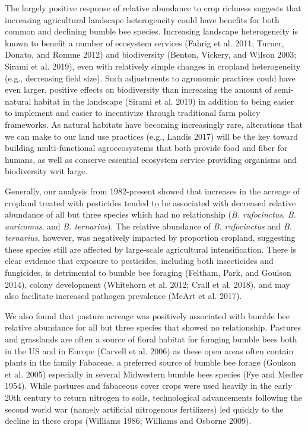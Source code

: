 \documentclass[11pt,]{article}
\begin{document}
The largely positive response of relative abundance to crop richness
suggests that increasing agricultural landscape heterogeneity could have
benefits for both common and declining bumble bee species. Increasing
landscape heterogeneity is known to benefit a number of ecosystem
services (Fahrig et al. 2011; Turner, Donato, and Romme 2012) and
biodiversity (Benton, Vickery, and Wilson 2003; Sirami et al. 2019),
even with relatively simple changes in cropland heterogeneity (e.g.,
decreasing field size). Such adjustments to agronomic practices could
have even larger, positive effects on biodiversity than increasing the
amount of semi-natural habitat in the landscape (Sirami et al. 2019) in
addition to being easier to implement and easier to incentivize through
traditional farm policy frameworks. As natural habitats have becoming
increasingly rare, alterations that we can make to our land use
practices (e.g., Landis 2017) will be the key toward building
multi-functional agroecosystems that both provide food and fiber for
humans, as well as conserve essential ecosystem service providing
organisms and biodiversity writ large.

Generally, our analysis from 1982-present showed that increases in the
acreage of cropland treated with pesticides tended to be associated with
decreased relative abundance of all but three species which had no
relationship (\emph{B. rufocinctus}, \emph{B. auricomus}, and \emph{B.
ternarius}). The relative abundance of \emph{B. rufocinctus} and
\emph{B. ternarius}, however, was negatively impacted by proportion
cropland, suggesting these species still are affected by large-scale
agricultural intensification. There is clear evidence that exposure to
pesticides, including both insecticides and fungicides, is detrimental
to bumble bee foraging (Feltham, Park, and Goulson 2014), colony
development (Whitehorn et al. 2012; Crall et al. 2018), and may also
facilitate increased pathogen prevalence (McArt et al. 2017).

We also found that pasture acreage was positively associated with bumble
bee relative abundance for all but three species that showed no
relationship. Pastures and grasslands are often a source of floral
habitat for foraging bumble bees both in the US and in Europe (Carvell
et al. 2006) as these open areas often contain plants in the family
Fabaceae, a preferred source of bumble bee forage (Goulson et al. 2005)
especially in several Midwestern bumble bees species (Fye and Medler
1954). While pastures and fabaceous cover crops were used heavily in the
early 20th century to return nitrogen to soils, technological
advancements following the second world war (namely artificial
nitrogenous fertilizers) led quickly to the decline in these crops
(Williams 1986; Williams and Osborne 2009).
\end{document}

